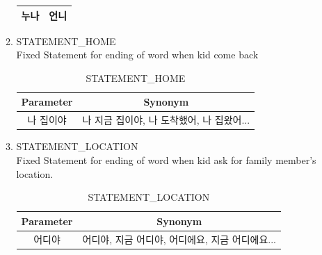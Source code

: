 \documentclass[conference]{IEEEtran}
\begin{document}
\begin{enumerate}
\begin{enumerate}
\begin{table}[htbp]
\begin{center}
\begin{tabular}{|c|c|}
       누나        & 언니      \\ \hline
       \end{tabular}
       \end{center}
       \end{table}
       \item STATEMENT\_HOME\\Fixed Statement for ending of word when kid come back 
       \begin{table}[htbp]
       \begin{center}
       \caption{STATEMENT\_HOME}
       \begin{tabular}{|c|c|}
       \hline
       Parameter & Synonym                    \\ \hline
       나 집이야     & 나 지금 집이야, 나 도착했어, 나 집왔어... \\ \hline
       \end{tabular}
       \end{center}
       \end{table}
       
       \item STATEMENT\_LOCATION\\
       Fixed Statement for ending of word when kid ask for family member’s location.
        \begin{table}[htbp]
        \begin{center}
        \caption{STATEMENT\_LOCATION}
       \begin{tabular}{|c|c|}
       \hline
       Parameter & Synonym                    \\ \hline
       어디야     & 어디야, 지금 어디야, 어디에요, 지금 어디에요... \\ \hline
       \end{tabular}
       \end{center}
       \end{table}
   \end{enumerate}
   

\end{enumerate}
\end{document}
